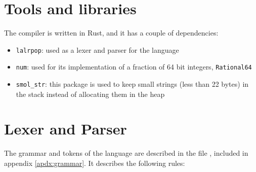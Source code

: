 \documentclass[11pt]{scrreprt}
\begin{document}
\section{Tools and libraries}
The compiler is written in Rust, and it has a couple of dependencies:
\begin{itemize}
  \item \texttt{lalrpop}: used as a lexer and parser for the language
  \item \texttt{num}: used for its implementation of a fraction of 64 bit integers, \texttt{Rational64}
  \item \texttt{smol\_str}: this package is used to keep small strings (less than 22 bytes) in the stack instead of allocating them in the heap
\end{itemize}

\section{Lexer and Parser}
The grammar and tokens of the language are described in the file , included in appendix \ref{apdx:grammar}. It describes the following rules:
\end{document}
